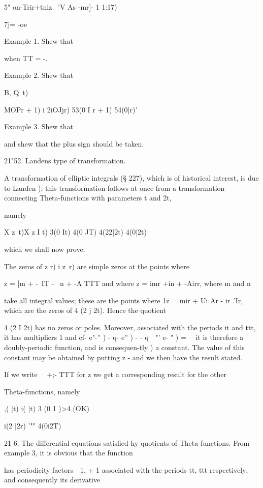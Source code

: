 5" on-Trir+tniz \ 'V As -mr]- 1 1:17)

7j= -oe

Example 1. Shew that

when TT = -.

Example 2. Shew that

B, Q\ t) \ %

MOPr + 1) i 2iOJjr) 53(0 I r + 1) 54(0|r)'

Example 3. Shew that

and shew that the plus sign should be taken.

21"52. Landens type of transformation.

A transformation of elliptic integrals (§ 227), which is of historical
interest, is due to Landen ); this transformation follows at
once from a transformation connecting Theta-functions with parameters
t and 2t,

namely

X z\ t)X z I t) 3(0 It) 4(0 JT) 4(22|2t) 4(0|2t)

which we shall now prove.

The zeros of z r) i z\ r) are simple zeros at the points where

z = [m + -\ IT - \ n + -A TTT and where z = imr +in + -Airr, where m
and n

%
%

take all integral values; these are the points where 1z = mir + Ui Ar
- ir .'Ir, which are the zeros of 4 (2 j 2t). Hence the quotient

 4 (2 I 2t) has no zeros or poles. Moreover, associated with the
periods it and ttt, it has multipliers 1 and cf- e"-'' ) - q- e'' ) -
- q~~"' e- " ) = \ \ it is therefore a doubly-periodic function, and
is consequen-tly ) a constant. The value of this constant may
be obtained by putting z - and we then have the result stated.

If we write \ \ +;- TTT for z we get a corresponding result for the
other

Theta-functions, namely

,( |t) i( |t) 3 (0 1 )>4 (OK)

 i(2 |2r) '"" 4(0i2T)

21-6. The differential equations satisfied hy quotients of
Theta-functions. From example 3, it is obvious that the
function

has periodicity factors - 1, + 1 associated with the periods tt, ttt
respectively; and consequently its derivative

